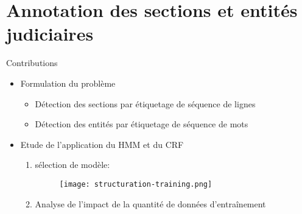 \section{Annotation des sections et entités judiciaires}
\begin{frame}[c]{Contributions}
	\begin{itemize}	
		\item Formulation du problème
		\begin{itemize}
			\item Détection des sections par étiquetage de séquence de lignes
			\item Détection des entités par étiquetage de séquence de mots
		\end{itemize}
	\item Etude de l'application du HMM et du CRF
	\begin{enumerate}		
		\item sélection de modèle:
		\begin{figure}
			\texttt{[image: structuration-training.png]}
		\end{figure}
		\item Analyse de l'impact de la quantité de données d'entraînement
	\end{enumerate}
\end{itemize}
\end{frame}
